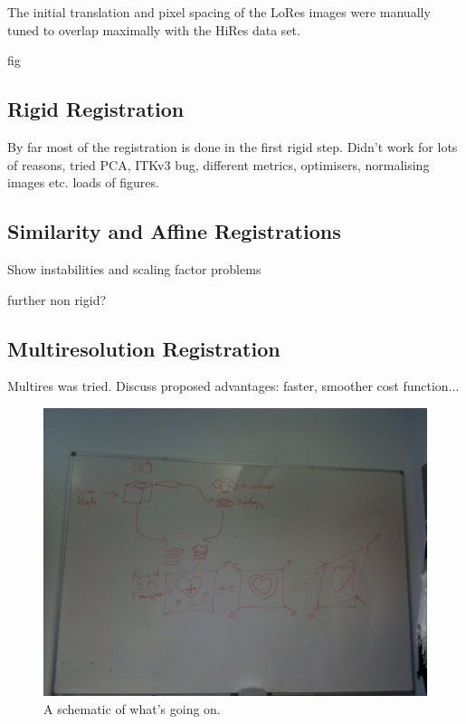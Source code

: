     The initial translation and pixel spacing of the LoRes images were manually tuned to overlap maximally with the HiRes data set.
    
  fig
    
  
  \subsection{Rigid Registration} %
  \label{sub:rigid_registration}
    By far most of the registration is done in the first rigid step. Didn't work for lots of reasons, tried PCA, ITKv3 bug, different metrics, optimisers, normalising images etc. loads of figures.
  
  \subsection{Similarity and Affine Registrations} %
  \label{sub:similarity_and_affine_registrations}
    Show instabilities and scaling factor problems
    
    further non rigid?
  
  \subsection{Multiresolution Registration} %
  \label{sub:multiresolution_registration}
    Multires was tried. Discuss proposed advantages: faster, smoother cost function...
  
  \begin{figure}[htbp]
    \centering
    \includegraphics[height=0.7\textwidth]{Ch6/Figs/process_diagram}
    \caption{A schematic of what's going on.}
  \end{figure}
  
